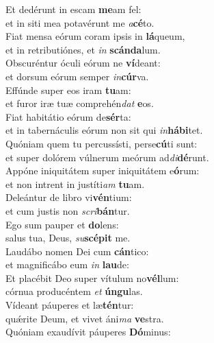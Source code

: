 \evenverse Et dedérunt in escam \textbf{me}am fel:~\*\\
\evenverse et in siti mea potavérunt me \textit{a}\textbf{cé}to.\\
\oddverse Fiat mensa eórum coram ipsis in \textbf{lá}queum,~\*\\
\oddverse et in retributiónes, et \textit{in} \textbf{scán}\textbf{da}lum.\\
\evenverse Obscuréntur óculi eórum ne \textbf{ví}deant:~\*\\
\evenverse et dorsum eórum semper \textit{in}\textbf{cúr}va.\\
\oddverse Effúnde super eos iram \textbf{tu}am:~\*\\
\oddverse et furor iræ tuæ comprehén\textit{dat} \textbf{e}os.\\
\evenverse Fiat habitátio eórum de\textbf{sér}ta:~\*\\
\evenverse et in tabernáculis eórum non sit qui \textit{in}\textbf{há}\textbf{bi}tet.\\
\oddverse Quóniam quem tu percussísti, perse\textbf{cú}ti sunt:~\*\\
\oddverse et super dolórem vúlnerum meórum ad\textit{di}\textbf{dé}runt.\\
\evenverse Appóne iniquitátem super iniquitátem e\textbf{ó}rum:~\*\\
\evenverse et non intrent in justíti\textit{am} \textbf{tu}am.\\
\oddverse Deleántur de libro vi\textbf{vén}tium:~\*\\
\oddverse et cum justis non \textit{scri}\textbf{bán}tur.\\
\evenverse Ego sum pauper et \textbf{do}lens:~\*\\
\evenverse salus tua, Deus, \textit{su}\textbf{scé}\textbf{pit} me.\\
\oddverse Laudábo nomen Dei cum \textbf{cán}tico:~\*\\
\oddverse et magnificábo eum \textit{in} \textbf{lau}de:\\
\evenverse Et placébit Deo super vítulum no\textbf{vél}lum:~\*\\
\evenverse córnua producéntem \textit{et} \textbf{ún}\textbf{gu}las.\\
\oddverse Vídeant páuperes et læ\textbf{tén}tur:~\*\\
\oddverse quǽrite Deum, et vivet áni\textit{ma} \textbf{ve}stra.\\
\evenverse Quóniam exaudívit páuperes \textbf{Dó}minus:~\*\\
